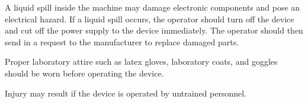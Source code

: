 A liquid spill inside the machine may damage electronic components and pose an electrical hazard.
If a liquid spill occurs, the operator should turn off the device and cut off the power supply to the device immediately. The operator should then send in a request to the manufacturer to replace damaged parts.

Proper laboratory attire such as latex gloves, laboratory coats, and goggles should be worn before operating the device. 

Injury may result if the device is operated by untrained personnel. 


